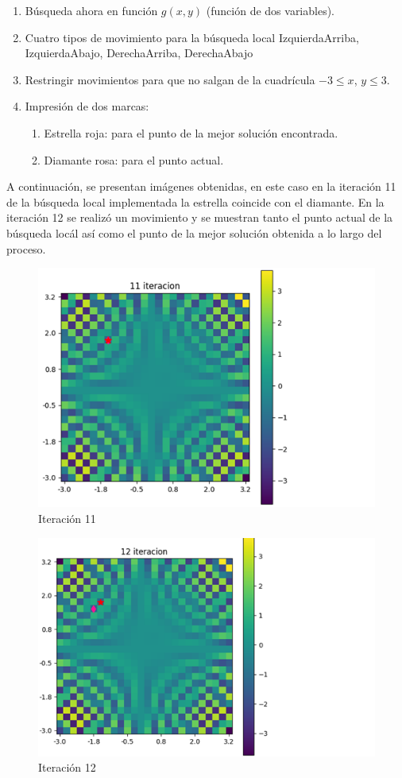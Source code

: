 \documentclass{article}
\begin{document}
\begin{enumerate}
	\item Búsqueda ahora en función $g(x,y)$ (función de dos variables).
	\item Cuatro tipos de movimiento para la búsqueda local {IzquierdaArriba, IzquierdaAbajo, DerechaArriba, DerechaAbajo}
	\item Restringir movimientos para que no salgan de la cuadrícula $-3 \leq x$, $y \leq 3$.
	\item 	Impresión de dos marcas:
	   \begin{enumerate}	
	   	\item Estrella roja: para el punto de la mejor solución encontrada.
   		\item Diamante rosa: para el punto actual.
		\end{enumerate}

\end{enumerate}

A continuación, se presentan imágenes obtenidas, en este caso en la iteración 11 de la búsqueda local implementada la estrella coincide con el diamante. En la iteración 12 se realizó un movimiento y se muestran tanto el punto actual de la búsqueda locál así como el punto de la mejor solución obtenida a lo largo del proceso.

	\begin{figure}[h!]
	\centering
	\includegraphics[width=0.7\linewidth]{Figure_3.png}
	\caption{Iteración 11}
	\label{fig:imagen3}

	\end{figure}

	\begin{figure}[h!]
	\centering
	\includegraphics[width=0.7\linewidth]{Figure_4.png}
	\caption{Iteración 12}
	\label{fig:imagen4}
	\end{figure}
\newpage
\end{document}
